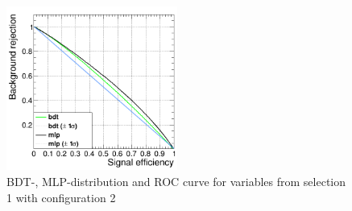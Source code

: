 \documentclass[11pt]{scrartcl}
\begin{document}
\begin{figure}[H]
\begin{minipage}{.5\textwidth}
	  \label{fig:distr_s1_config2_mlp}
	\end{minipage}
	\centering
	\includegraphics[width=0.5\textwidth]{figures/MVA/select1/config2/FOM_selection1_nL7_nT800_mD3_nC20.png}
	\caption{BDT-, MLP-distribution and ROC curve for variables from selection 1 with configuration 2}
	 \label{fig:ROC_s1_config2}
	\end{figure}
	
\end{document}
